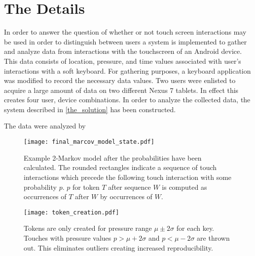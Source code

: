 \section{The Details}
\label{the_details}
In order to answer the question of
whether or not touch screen interactions may be used
in order to distinguish between users
a system is implemented to gather and analyze data
from interactions with the touchscreen of an Android device.
This data consists of location, pressure, and time
values associated with user's interactions with a soft keyboard.
%
For gathering purposes,
a keyboard application was modified to record
the necessary data values.
%
Two users were enlisted to acquire a large 
amount of data on two different Nexus 7 tablets.
In effect this creates four user, device combinations.
%
In order to analyze the collected data,
the system described in \ref{the_solution}
has been constructed.

The data were analyzed by 

\begin{figure}
\centering
\texttt{[image: final\_marcov\_model\_state.pdf]}
\caption{
Example 2-Markov model after the probabilities have been calculated.
The rounded rectangles indicate 
a sequence of touch interactions 
which precede the following touch interaction with some probability $p$.
$p$ for token $T$ after sequence $W$ is computed 
as occurrences of $T$ after $W$
by occurrences of $W$.
}
\label{fig:final_markov_model_state}
\end{figure}

\begin{figure}
\centering
\texttt{[image: token\_creation.pdf]}
\caption{
Tokens are only created for 
pressure range $\mu \pm 2\sigma$ 
for each key.
Touches with pressure values
$p>\mu + 2\sigma$ and $p<\mu - 2\sigma$
are thrown out.
This eliminates outliers creating
increased reproducibility.
}
\label{fig:token_creation}
\end{figure}

